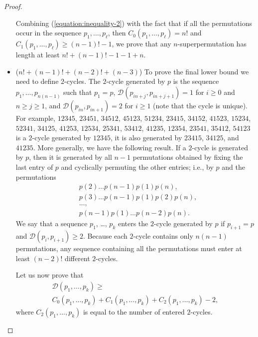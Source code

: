 \begin{proof}
\begin{itemize}
      Combining (\ref{equation:inequality-2}) with the
      fact that if all the
      permutations occur in the sequence $p_1, \dots, p_\ell$, then
      $C_0(p_1, \dots, p_\ell) = n!$ and $C_1(p_1, \dots, p_\ell) \ge
      (n - 1)! - 1$,
      we prove that any $n$-superpermutation has length at least
      $n! + (n - 1)! - 1 - 1 + n$.
    \item ($n! + (n - 1)! + (n - 2)! + (n - 3)$)
      To prove the final lower bound we need to define $2$-cycles. The $2$-cycle
      generated by $p$ is the sequence $p_1, \dots, p_{n(n - 1)}$ such that
      $p_1 = p$, $\mathcal{D}(p_{in + j}, p_{in + j + 1}) = 1$ for $i \ge 0$
      and $n \ge j \ge 1$, and $\mathcal{D}(p_{in}, p_{in + 1}) = 2$ for
      $i \ge 1$ (note that the cycle is unique). For example,
      $12345$, $23451$, $34512$, $45123$, $51234$, $23415$, $34152$, $41523$,
      $15234$, $52341$, $34125$, $41253$, $12534$, $25341$, $53412$, $41235$,
      $12354$, $23541$, $35412$, $54123$ is a $2$-cycle generated by $12345$,
      it is also generated by $23415$, $34125$, and $41235$. More generally, we
      have the following result. If a $2$-cycle is generated by $p$, then it is
      generated by all $n - 1$ permutations obtained by fixing the
      last entry of $p$ and cyclically permuting the other entries; i.e., by
      $p$ and the permutations
      \begin{align*}
        &p(2) \dots p(n - 1) p(1)p(n), \\
        &p(3) \dots p(n - 1) p(1) p(2) p(n), \\
        &\dots, \\
        &p(n - 1) p(1) \dots p(n - 2) p(n).
      \end{align*}
      We say that a sequence $p_1$, \dots, $p_k$ enters the $2$-cycle generated
      by $p$ if $p_{i + 1} = p$ and $\mathcal{D}(p_i, p_{i + 1}) \ge 2$.
      Because each $2$-cycle contains only $n (n - 1)$ permutations, any
      sequence containing all the permutations must enter at least $(n - 2)!$
      different $2$-cycles.

      Let us now prove that
      \begin{multline}
        \label{equation:inequality-3}
        \mathcal{D}(p_1, \dots, p_k) \ge \\
        C_0(p_1, \dots, p_k) + C_1(p_1, \dots, p_k) + C_2(p_1, \dots, p_k) - 2,
      \end{multline}
      where $C_2(p_1, \dots, p_k)$ is equal to the number of entered $2$-cycles.


\end{itemize}
\end{proof}
